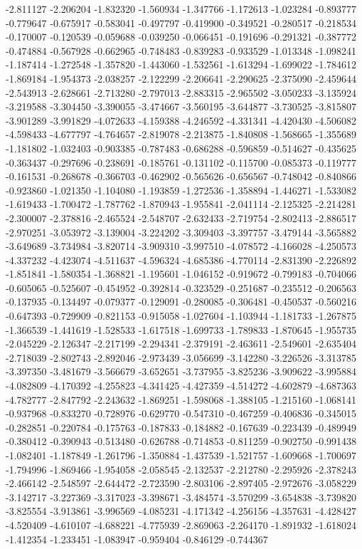 -2.811127
-2.206204
-1.832320
-1.560934
-1.347766
-1.172613
-1.023284
-0.893777
-0.779647
-0.675917
-0.583041
-0.497797
-0.419900
-0.349521
-0.280517
-0.218534
-0.170007
-0.120539
-0.059688
-0.039250
-0.066451
-0.191696
-0.291321
-0.387772
-0.474884
-0.567928
-0.662965
-0.748483
-0.839283
-0.933529
-1.013348
-1.098241
-1.187414
-1.272548
-1.357820
-1.443060
-1.532561
-1.613294
-1.699022
-1.784612
-1.869184
-1.954373
-2.038257
-2.122299
-2.206641
-2.290625
-2.375090
-2.459644
-2.543913
-2.628661
-2.713280
-2.797013
-2.883315
-2.965502
-3.050233
-3.135924
-3.219588
-3.304450
-3.390055
-3.474667
-3.560195
-3.644877
-3.730525
-3.815807
-3.901289
-3.991829
-4.072633
-4.159388
-4.246592
-4.331341
-4.420430
-4.506082
-4.598433
-4.677797
-4.764657
-2.819078
-2.213875
-1.840808
-1.568665
-1.355689
-1.181802
-1.032403
-0.903385
-0.787483
-0.686288
-0.596859
-0.514627
-0.435625
-0.363437
-0.297696
-0.238691
-0.185761
-0.131102
-0.115700
-0.085373
-0.119777
-0.161531
-0.268678
-0.366703
-0.462902
-0.565626
-0.656567
-0.748042
-0.840866
-0.923860
-1.021350
-1.104080
-1.193859
-1.272536
-1.358894
-1.446271
-1.533082
-1.619433
-1.700472
-1.787762
-1.870943
-1.955841
-2.041114
-2.125325
-2.214281
-2.300007
-2.378816
-2.465524
-2.548707
-2.632433
-2.719754
-2.802413
-2.886517
-2.970251
-3.053972
-3.139004
-3.224202
-3.309403
-3.397757
-3.479144
-3.565882
-3.649689
-3.734984
-3.820714
-3.909310
-3.997510
-4.078572
-4.166028
-4.250573
-4.337232
-4.423074
-4.511637
-4.596324
-4.685386
-4.770114
-2.831390
-2.226892
-1.851841
-1.580354
-1.368821
-1.195601
-1.046152
-0.919672
-0.799183
-0.704066
-0.605065
-0.525607
-0.454952
-0.392814
-0.323529
-0.251687
-0.235512
-0.206563
-0.137935
-0.134497
-0.079377
-0.129091
-0.280085
-0.306481
-0.450537
-0.560216
-0.647393
-0.729909
-0.821153
-0.915058
-1.027604
-1.103944
-1.181733
-1.267875
-1.366539
-1.441619
-1.528533
-1.617518
-1.699733
-1.789833
-1.870645
-1.955735
-2.045229
-2.126347
-2.217199
-2.294341
-2.379191
-2.463611
-2.549601
-2.635404
-2.718039
-2.802743
-2.892046
-2.973439
-3.056699
-3.142280
-3.226526
-3.313785
-3.397350
-3.481679
-3.566679
-3.652651
-3.737955
-3.825236
-3.909622
-3.995884
-4.082809
-4.170392
-4.255823
-4.341425
-4.427359
-4.514272
-4.602879
-4.687363
-4.782777
-2.847792
-2.243632
-1.869251
-1.598068
-1.388105
-1.215160
-1.068141
-0.937968
-0.833270
-0.728976
-0.629770
-0.547310
-0.467259
-0.406836
-0.345015
-0.282851
-0.220784
-0.175763
-0.187833
-0.184882
-0.167639
-0.223439
-0.489949
-0.380412
-0.390943
-0.513480
-0.626788
-0.714853
-0.811259
-0.902750
-0.991438
-1.082401
-1.187849
-1.261796
-1.350884
-1.437539
-1.521757
-1.609668
-1.700697
-1.794996
-1.869466
-1.954058
-2.058545
-2.132537
-2.212780
-2.295926
-2.378243
-2.466142
-2.548597
-2.644472
-2.723590
-2.803106
-2.897405
-2.972676
-3.058229
-3.142717
-3.227369
-3.317023
-3.398671
-3.484574
-3.570299
-3.654838
-3.739820
-3.825554
-3.913861
-3.996569
-4.085231
-4.171342
-4.256156
-4.357631
-4.428427
-4.520409
-4.610107
-4.688221
-4.775939
-2.869063
-2.264170
-1.891932
-1.618024
-1.412354
-1.233451
-1.083947
-0.959404
-0.846129
-0.744367
